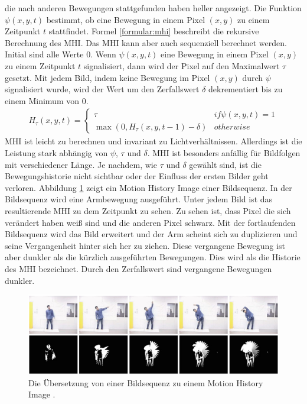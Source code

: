 die nach anderen Bewegungen stattgefunden haben heller angezeigt. Die Funktion $\psi(x,y,t)$ bestimmt, ob eine Bewegung in einem Pixel $(x,y)$ zu einem Zeitpunkt $t$ stattfindet.
\newline
\newline
Formel \ref{formular:mhi} beschreibt die rekursive Berechnung des MHI. Das MHI kann aber auch sequenziell berechnet werden. Initial sind alle Werte 0. Wenn $\psi(x,y,t)$ eine Bewegung in einem Pixel $(x,y)$
zu einem Zeitpunkt $t$ signalisiert, dann wird der Pixel auf den Maximalwert $\tau$ gesetzt. Mit jedem Bild, indem keine Bewegung im Pixel $(x,y)$ durch $\psi$ signalisiert wurde, wird der Wert um den
Zerfallswert $\delta$ dekrementiert bis zu einem Minimum von 0.
\begin{align}
    H_{\tau}(x,y,t) = \begin{cases}
                          \tau & if \psi(x,y,t) = 1 \\
                          \max(0, H_{\tau}(x,y,t-1) - \delta) & otherwise
    \end{cases}
    \label{formular:mhi}
\end{align}
MHI ist leicht zu berechnen und invariant zu Lichtverhältnissen. Allerdings ist die Leistung stark abhängig von $\psi$, $\tau$ und $\delta$. MHI ist besonders anfällig für Bildfolgen mit verschiedener Länge.
Je nachdem, wie $\tau$ und $\delta$ gewählt sind, ist die Bewegungshistorie nicht sichtbar oder der Einfluss der ersten Bilder geht verloren.
\newline
\newline
Abbildung \ref{fig:mhi_ex} zeigt ein Motion History Image einer Bildsequenz. In der Bildsequenz wird eine Armbewegung ausgeführt. Unter jedem Bild ist das resultierende MHI zu dem Zeitpunkt zu sehen.
Zu sehen ist, dass Pixel die sich verändert haben weiß sind und die anderen Pixel schwarz. Mit der fortlaufenden Bildsequenz wird das Bild erweitert und der Arm scheint sich zu duplizieren und seine
Vergangenheit hinter sich her zu ziehen. Diese vergangene Bewegung ist aber dunkler als die kürzlich ausgeführten Bewegungen. Dies wird als die Historie des MHI bezeichnet. Durch den Zerfallswert sind
vergangene Bewegungen dunkler.
\begin{figure}
    \centering
    \includegraphics[width=\linewidth]{images/mhi_ex.png}
    \caption{Die Übersetzung von einer Bildsequenz zu einem Motion History Image \cite{ahad2012motion}.}
    \label{fig:mhi_ex}
\end{figure}